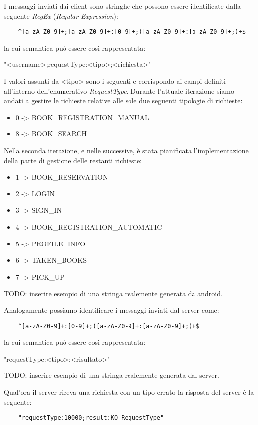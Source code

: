 I messaggi inviati dai client sono stringhe che possono essere identificate dalla seguente \textit{RegEx} (\textit{Regular Expression}): 
\begin{center}
	\begin{lstlisting}
	^[a-zA-Z0-9]+;[a-zA-Z0-9]+:[0-9]+;([a-zA-Z0-9]+:[a-zA-Z0-9]+;)+$
	\end{lstlisting}
\end{center}
la cui semantica può essere così rappresentata:
\begin{center}
"<username>;requestType:<tipo>;<richiesta>"
\end{center}
I valori assunti da <tipo> sono i seguenti e corrispondo ai campi definiti all'interno dell'enumerativo \textit{RequestType}.
Durante l'attuale iterazione siamo andati a gestire le richieste relative alle sole due seguenti tipologie di richieste:
\begin{itemize}
	\item 0 -> BOOK\_REGISTRATION\_MANUAL
	\item 8 -> BOOK\_SEARCH
\end{itemize}

Nella seconda iterazione, e nelle successive, è stata pianificata l'implementazione della parte di gestione delle restanti richieste:

\begin{itemize}
	\item 1 -> BOOK\_RESERVATION	
	\item 2 -> LOGIN
	\item 3 -> SIGN\_IN
	\item 4 -> BOOK\_REGISTRATION\_AUTOMATIC
	\item 5 -> PROFILE\_INFO
	\item 6 -> TAKEN\_BOOKS
	\item 7 -> PICK\_UP	
\end{itemize}



TODO: inserire esempio di una stringa realemente generata da android.


Analogamente possiamo identificare i messaggi inviati dal server come:
\begin{center}
	\begin{lstlisting}
	^[a-zA-Z0-9]+:[0-9]+;([a-zA-Z0-9]+:[a-zA-Z0-9]+;)+$
	\end{lstlisting}
\end{center}
la cui semantica può essere così rappresentata:
\begin{center}
	"requestType:<tipo>;<risultato>"
\end{center}

TODO: inserire esempio di una stringa realemente generata dal server.


Qual'ora il server riceva una richiesta con un tipo errato la risposta del server è la seguente:
\begin{center}
	\begin{lstlisting}
	"requestType:10000;result:KO_RequestType"
	\end{lstlisting}
\end{center}




